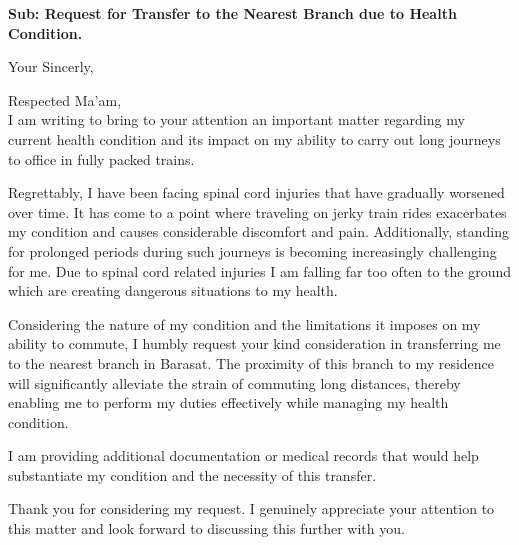 \documentclass[11pt,a4paper,roman]{moderncv}
\begin{document}
\date{April, 25 2023}

\opening{\textbf{Sub: Request for Transfer to the Nearest Branch due to Health Condition.}}
\closing{Your Sincerly, \vspace{-2em}}



\makelettertitle



Respected Ma'am,
\\
\vspace{1em}
I am writing to bring to your attention an important matter 
regarding my current health condition and its impact on my 
ability to carry out long journeys to office in fully packed trains.

\vspace{1em}
Regrettably, I have been facing spinal cord injuries that have gradually worsened over time. It has come to a point where traveling on jerky train rides exacerbates my condition and causes considerable discomfort and pain.
Additionally, standing for prolonged periods during such 
journeys is becoming increasingly challenging for me. Due to spinal cord related injuries I am falling far too often to the ground which are creating
dangerous situations to my health.

\vspace{1em}
Considering the nature of my condition and the limitations it imposes on my ability to commute, I humbly request your kind consideration in transferring me to the nearest branch in Barasat.
The proximity of this branch to my residence will significantly alleviate the strain of commuting long distances, thereby enabling me to perform my duties effectively while managing my health condition.

I am providing additional documentation or medical records that would help substantiate my condition and the necessity of this transfer.


Thank you for considering my request. 
I genuinely appreciate your attention to this matter and look forward to discussing this further with you.

\vspace{0.5cm}


\makeletterclosing
\end{document}
